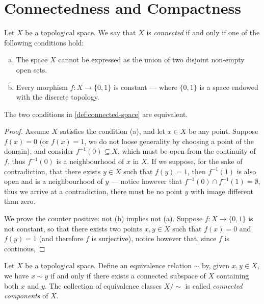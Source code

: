 \section{Connectedness and Compactness}

\begin{definition}
\label{def:connected-space}
Let \(X\) be a topological space. We say that \(X\) is \emph{connected} if and
only if one of the following conditions hold:
\begin{enumerate}[(a)]\setlength\itemsep{0em}
\item The space \(X\) cannot be expressed as the union of two disjoint non-empty
  open sets.
\item Every morphism \(f: X \to \{0, 1\}\) is constant --- where \(\{0, 1\}\) is a
  space endowed with the discrete topology.
\end{enumerate}
\end{definition}

\begin{corollary}
The two conditions in \cref{def:connected-space} are equivalent.
\end{corollary}

\begin{proof}
Assume \(X\) satisfies the condition (a), and let \(x \in X\) be any
point. Suppose \(f(x) = 0\) (or \(f(x) = 1\), we do not loose generality by
choosing a point of the domain), and consider \(f^{-1}(0) \subseteq X\), which
must be open from the continuity of \(f\), thus \(f^{-1}(0)\) is a neighbourhood
of \(x\) in \(X\). If we suppose, for the sake of contradiction, that there
exists \(y \in X\) such that \(f(y) = 1\), then \(f^{-1}(1)\) is also open and
is a neighbourhood of \(y\) --- notice however that \(f^{-1}(0) \cap f^{-1}(1) =
\emptyset\), thus we arrive at a contradiction, there must be no point \(y\)
with image different than zero.

We prove the counter positive: not (b) implies not (a). Suppose \(f: X
\to \{0, 1\}\) is not constant, so that there exists two points \(x, y \in X\)
such that \(f(x) = 0\) and \(f(y) = 1\) (and therefore \(f\) is surjective),
notice however that, since \(f\) is continous,
\end{proof}

\begin{definition}
\label{def:connected-components}
Let \(X\) be a topological space. Define an equivalence relation \(\sim\) by,
given \(x, y \in X\), we have \(x \sim y\) if and only if there exists a
connected subspace of \(X\) containing both \(x\) and \(y\). The collection of
equivalence classes \(X/{\sim}\) is called \emph{connected components} of \(X\).
\end{definition}

